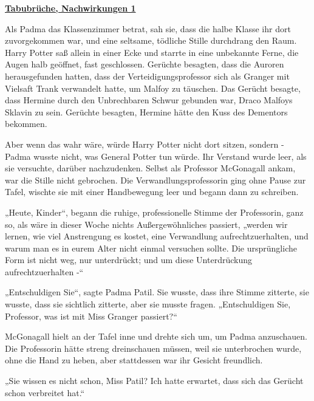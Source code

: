 

\hypertarget{tabubruxfcche-nachwirkungen-1}{%

\textbf{\uline{Tabubrüche, Nachwirkungen 1}}

\hfill\break Als Padma das Klassenzimmer betrat, sah sie, dass die halbe Klasse ihr dort zuvorgekommen war, und eine seltsame, tödliche Stille durchdrang den Raum. Harry Potter saß allein in einer Ecke und starrte in eine unbekannte Ferne, die Augen halb geöffnet, fast geschlossen. Gerüchte besagten, dass die Auroren herausgefunden hatten, dass der Verteidigungsprofessor sich als Granger mit Vielsaft Trank verwandelt hatte, um Malfoy zu täuschen. Das Gerücht besagte, dass Hermine durch den Unbrechbaren Schwur gebunden war, Draco Malfoys Sklavin zu sein. Gerüchte besagten, Hermine hätte den Kuss des Dementors bekommen.

Aber wenn das wahr wäre, würde Harry Potter nicht dort sitzen, sondern - Padma wusste nicht, was General Potter tun würde. Ihr Verstand wurde leer, als sie versuchte, darüber nachzudenken. Selbst als Professor McGonagall ankam, war die Stille nicht gebrochen. Die Verwandlungsprofessorin ging ohne Pause zur Tafel, wischte sie mit einer Handbewegung leer und begann dann zu schreiben.

„Heute, Kinder“, begann die ruhige, professionelle Stimme der Professorin, ganz so, als wäre in dieser Woche nichts Außergewöhnliches passiert, „werden wir lernen, wie viel Anstrengung es kostet, eine Verwandlung aufrechtzuerhalten, und warum man es in eurem Alter nicht einmal versuchen sollte. Die ursprüngliche Form ist nicht weg, nur unterdrückt; und um diese Unterdrückung aufrechtzuerhalten -“

„Entschuldigen Sie“, sagte Padma Patil. Sie wusste, dass ihre Stimme zitterte, sie wusste, dass sie sichtlich zitterte, aber sie musste fragen. „Entschuldigen Sie, Professor, was ist mit Miss Granger passiert?“

McGonagall hielt an der Tafel inne und drehte sich um, um Padma anzuschauen. Die Professorin hätte streng dreinschauen müssen, weil sie unterbrochen wurde, ohne die Hand zu heben, aber stattdessen war ihr Gesicht freundlich.

„Sie wissen es nicht schon, Miss Patil? Ich hatte erwartet, dass sich das Gerücht schon verbreitet hat.“

}
